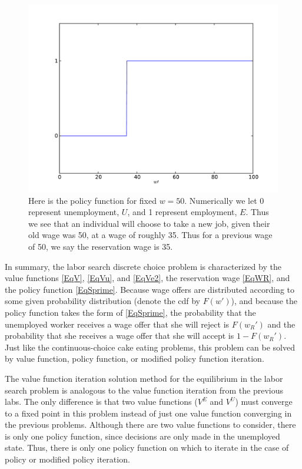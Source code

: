 \begin{figure}
\includegraphics[width=\textwidth]{disc_policy.pdf}
\caption{Here is the policy function for fixed $w = 50$.  Numerically we let 0 represent unemployment, $U$,
and 1 represent employment, $E$.  Thus we see that an individual will choose to take a new job, given
their old wage was 50, at a wage of roughly 35.  Thus for a previous wage of 50, we say the reservation wage is 35.}
\label{fig:disc_policy}
\end{figure}

In summary, the labor search discrete choice problem is characterized by the value functions \eqref{EqV}, \eqref{EqVu},
and \eqref{EqVe2}, the reservation wage \eqref{EqWR}, and the policy function \eqref{EqSprime}. Because wage offers
are distributed according to some given probability distribution (denote the cdf by $F(w')$),
and because the policy function takes the form of \eqref{EqSprime},
the probability that the unemployed worker receives a wage offer that she will reject is $F(w_R')$ and the probability
that she receives a wage offer that she will accept is $1 - F(w_R')$. Just like the continuous-choice cake eating
problems, this problem can be solved by value function, policy function, or modified policy function iteration.

The value function iteration solution method for the equilibrium in the labor search problem is analogous to the
value function iteration from the previous labs. The only difference is that two value functions ($V^E$ and $V^U$)
must converge to a fixed point in this problem instead of just one value function converging in the previous problems.
Although there are two value functions to consider, there is only one policy function, since decisions are only made
in the unemployed state.  Thus, there is only one policy function on which to iterate in the case of policy or modified
policy iteration.

